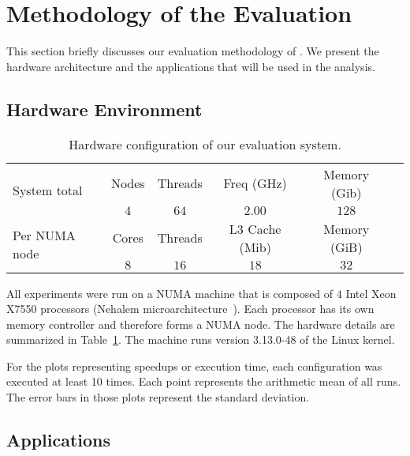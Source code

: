 
\section{Methodology of the Evaluation}
\label{sec:metho}

This section briefly discusses our evaluation methodology of \TABARNAC.
We present the hardware architecture and the applications that will be used in the analysis.

\subsection{Hardware Environment}
\label{sec:expe-setup}

\begin{table}[!b]
    \centering
    \caption{Hardware configuration of our evaluation system.}
    \label{tab:turing}
    \footnotesize
        \begin{tabular}{lccccc}
            \toprule
            \multirow{2}{1.5cm}{System total} & Nodes & Threads & Freq (GHz) & Memory (Gib) \\
            \cmidrule(lr){2-5}
                & $4$   & $64$ & $2.00$ & $128$ \\
            \midrule
           \multirow{2}{1.5cm}{\vspace{2mm}Per NUMA node} & Cores & Threads & L3 Cache (Mib) & Memory (GiB) \\
           \cmidrule(lr){2-5}
            & $8$ & $16$ & $18$ & $32$  \\
            \bottomrule
        \end{tabular}

\end{table}

All experiments were run on a NUMA machine that is composed of $4$ Intel Xeon X7550
processors (Nehalem microarchitecture~\cite{Intel2010}). Each processor has its own memory controller and therefore forms a NUMA node. The hardware details are summarized in Table~\ref{tab:turing}.
The machine runs version 3.13.0-48 of the Linux kernel.

For the plots representing speedups or execution time, each configuration was executed at least 10 times. Each point represents the arithmetic mean of all runs.
The error bars in those plots represent the standard deviation.

\subsection{Applications}

